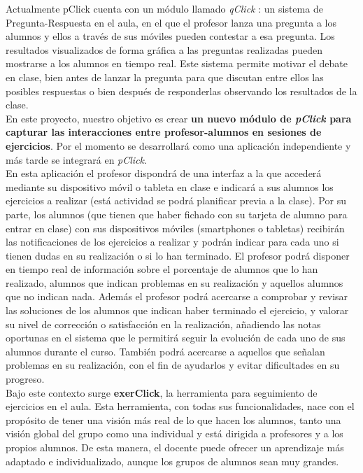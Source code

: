 Actualmente pClick cuenta con un módulo llamado \textit{qClick} \cite{qclick}: un sistema de Pregunta-Respuesta en el aula, en el que el profesor lanza una pregunta a los alumnos y ellos a través de sus móviles pueden contestar a esa pregunta. Los resultados visualizados de forma gráfica a las preguntas realizadas pueden mostrarse a los alumnos en tiempo real. Este sistema permite motivar el debate en clase, bien antes de lanzar la pregunta para que discutan entre ellos las posibles respuestas o bien después de responderlas observando los resultados de la clase.\\

En este proyecto, nuestro objetivo es crear \textbf{un nuevo módulo de \textit{pClick} para capturar las interacciones entre profesor-alumnos en sesiones de ejercicios}. Por el momento se desarrollará como una aplicación independiente y más tarde se integrará en \textit{pClick}.\\

En esta aplicación el profesor dispondrá de una interfaz a la que accederá mediante su dispositivo móvil o tableta en clase e indicará a sus alumnos los ejercicios a realizar (está actividad se podrá planificar previa a la clase). Por su parte, los alumnos (que tienen que haber fichado con su tarjeta de alumno para entrar en clase) con sus dispositivos móviles (smartphones o tabletas) recibirán las notificaciones de los ejercicios a realizar y podrán indicar para cada uno si tienen dudas en su realización o si lo han terminado. El profesor podrá disponer en tiempo real de información sobre el porcentaje de alumnos que lo han realizado, alumnos que indican problemas en su realización y aquellos alumnos que no indican nada. Además el profesor podrá acercarse a comprobar y revisar las soluciones de los alumnos que indican haber terminado el ejercicio, y valorar su nivel de corrección o satisfacción en la realización, añadiendo las notas oportunas en el sistema que le permitirá seguir la evolución de cada uno de sus alumnos durante el curso. También podrá acercarse a aquellos que señalan problemas en su realización, con el fin de ayudarlos y evitar dificultades en su progreso.\\

Bajo este contexto surge \textbf{exerClick}, la herramienta para seguimiento de ejercicios en el aula. Esta herramienta, con todas sus funcionalidades, nace con el propósito de tener una visión más real de lo que hacen los alumnos, tanto una visión global del grupo como una individual y está dirigida a profesores y a los propios alumnos. De esta manera, el docente puede ofrecer un aprendizaje más adaptado e individualizado, aunque los grupos de alumnos sean muy grandes.\\

